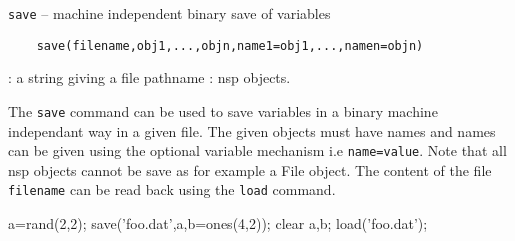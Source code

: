 \begin{mandesc}
  \texttt{save} -- machine independent binary save of variables \\ %
\end{mandesc}
\label{save}
\begin{calling_sequence}
  \begin{verbatim}
    save(filename,obj1,...,objn,name1=obj1,...,namen=objn)  
  \end{verbatim}
\end{calling_sequence}
\begin{parameters}
  \begin{varlist}
    : a string giving a file pathname 
    : nsp objects. 
  \end{varlist}
\end{parameters}
\begin{mandescription}
  The \verb!save! command can be used to save variables in a binary machine independant way 
  in a given file. The given objects must have names and names can be given using the optional 
  variable mechanism i.e \verb+name=value+. Note that all nsp objects cannot be save as for example 
  a File object. The content of the file \verb+filename+ can be read back using the \verb+load+ command.
\end{mandescription}
\begin{examples}
  \begin{program}
    a=rand(2,2);
    save('foo.dat',a,b=ones(4,2));
    clear a,b;
    load('foo.dat');
  \end{program}
\end{examples}
\begin{manseealso}
\end{manseealso}

